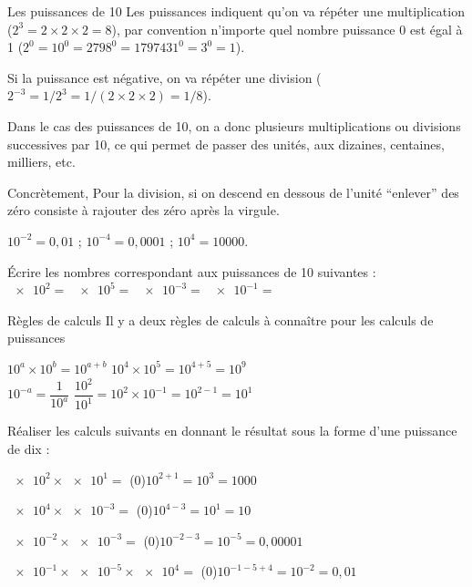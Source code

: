 
\begin{doc}{Les puissances de 10}
  Les puissances indiquent qu'on va répéter une multiplication ($2^3 = 2 \times 2 \times 2 = 8$), par convention n'importe quel nombre puissance 0 est égal à 1 ($2^0 = 10^0 = 2798^0 = 1797431^0 = 3^0 = 1$). 

  Si la puissance est négative, on va répéter une division ($2^{-3} = 1 / 2^3 = 1 / (2\times 2\times 2) = 1/8$).

  Dans le cas des puissances de 10, on a donc plusieurs multiplications ou divisions successives par 10, ce qui permet de passer des unités, aux dizaines,  centaines, milliers, etc.

  \begin{importants}
    Concrètement, 
    Pour la division, si on descend en dessous de l'unité ``enlever'' des zéro consiste à rajouter des zéro après la virgule.

    \exemple*{} $10^{-2} = 0,01$ ; $10^{-4}= 0,0001$ ; $10^4 = \num{10000}$.
  \end{importants}
\end{doc}

\numeroQuestion Écrire les nombres correspondant aux puissances de 10 suivantes : \\
$\num{e2}  =$  \qq{}
$\num{e5}  =$  \qq{}
$\num{e-3} =$  \qq{}
$\num{e-1} =$ 

\begin{doc}{Règles de calculs}
  Il y a deux règles de calculs à connaître pour les calculs de puissances
  \begin{importants}
    \pointCyan $10^a \times 10^b = 10^{a + b}$ 
    \qq{} \exemple $10^4 \times 10^5 = 10^{4 + 5} = 10^{9}$ \\
    \pointCyan $10^{-a} = \dfrac{1}{10^a}$
    \qq{} \exemple $\dfrac{10^2}{10^1} = 10^2 \times 10^{-1} = 10^{2 - 1} = 10^1$
  \end{importants}
\end{doc}


\numeroQuestion Réaliser les calculs suivants en donnant le résultat sous la forme d'une puissance de dix :
\pasCorrection{\vspace*{-4pt}}
\begin{listePoints}[2]
  \setlength\itemsep{-4pt}
  \item $\num{e2} \times \num{e1}  =$ \texteTrou(0){$10^{2 + 1} = 10^3 = 1000$}
  \item $\num{e4} \times \num{e-3} =$ \texteTrou(0){$10^{4 - 3} = 10^1 = 10$}
  \item $\num{e-2}\times \num{e-3} =$ \texteTrou(0){$10^{-2 -3} = 10^{-5} = 0,00001$}
  \item $\num{e-1}\times \num{e-5}\times \num{e4}=$ \texteTrou(0){$10^{-1 -5 +4} = 10^{-2} = 0,01$}
\end{listePoints}


